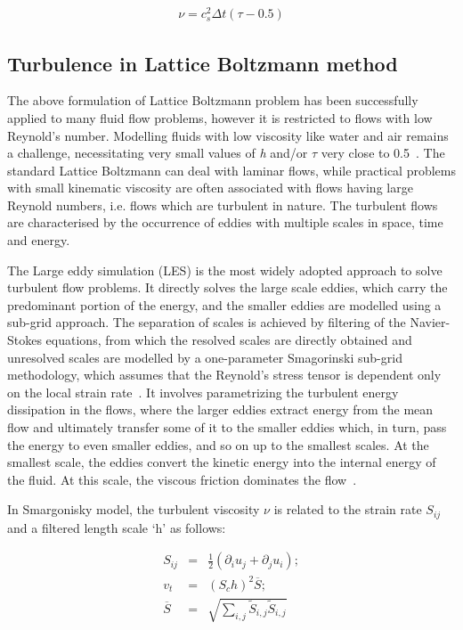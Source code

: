 \begin{align}
\nu=c_s^2\Delta t(\tau-0.5)
\end{align}


\subsection{Turbulence in Lattice Boltzmann method}

The above formulation of Lattice Boltzmann problem has been successfully 
applied to many fluid flow problems, however it is restricted to flows with low 
Reynold's number. Modelling fluids with low viscosity like water and air 
remains a challenge, necessitating very small values of \textit{h} and/or 
$\tau$ very close to 0.5~\citep{He1997}. The standard Lattice Boltzmann can 
deal with laminar flows, while practical problems with small kinematic 
viscosity are often associated with flows having large Reynold numbers, i.e. 
flows which are turbulent in nature. The turbulent flows are characterised by 
the occurrence of eddies with multiple scales in space, time and energy.

The Large eddy simulation (LES) is the most widely adopted approach to solve 
turbulent flow problems. It directly solves the large scale eddies, which carry 
the predominant portion of the energy, and the smaller eddies are modelled 
using a sub-grid approach. The separation of scales is achieved by filtering of 
the Navier-Stokes equations, from which the resolved scales are directly 
obtained and unresolved scales are modelled by a one-parameter Smagorinski 
sub-grid methodology, which assumes that the Reynold's stress tensor is 
dependent only on the local strain rate~\citep{Smagorinsky1963}. It involves 
parametrizing the turbulent energy dissipation in the flows, where the larger 
eddies extract energy from the mean flow and ultimately transfer some of it to 
the smaller eddies which, in turn, pass the energy to even smaller eddies, and 
so on up to the smallest scales. At the smallest scale, the eddies convert the 
kinetic energy into the internal energy of the fluid. At this scale, the 
viscous friction dominates the flow~\citep{Frisch1995}.

In Smargonisky model, the turbulent viscosity $\nu$ is related to the strain 
rate $S_{ij}$ and a filtered length scale `h' as follows:

\begin{align}
S_{ij} & = &\frac{1}{2}(\partial_i u_j + \partial_j u_i); \\
\mathit{v}_{\mathit{t}} & = & (\mathit{S}_{c}\mathit{h})^{2}\overline{S}; \\
\overline{S} & = & 
\sqrt{\sum\limits_{\mathit{i,j}}{\tilde{S}_{\mathit{i,j}}\tilde{S}_{\mathit{i,j}}}}
\end{align}

